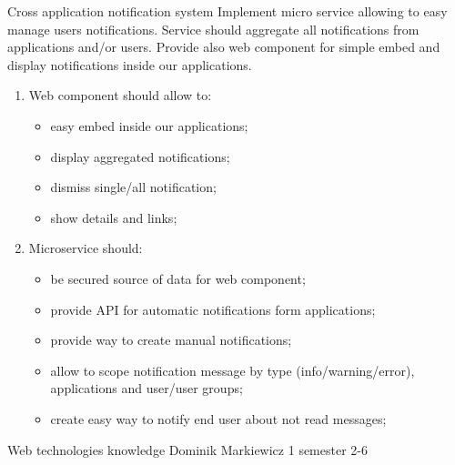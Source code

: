 \begin{project}
{Cross application notification system}
{Implement micro service allowing to easy manage users notifications. Service should aggregate all notifications from applications and/or users. Provide also web component for simple embed and display notifications inside our applications.} 
{
\begin{enumerate}
	\item Web component should allow to:
		\begin{itemize}
			\item easy embed inside our applications;
			\item display aggregated notifications;
			\item dismiss single/all notification;
			\item show details and links;
		\end{itemize}
	\item Microservice should:
		\begin{itemize}
			\item be secured source of data for web component;
			\item provide API for automatic notifications form applications;
			\item provide way to create manual notifications;
			\item allow to scope notification message by type (info/warning/error), applications and user/user groups;
			\item create easy way to notify end user about not read messages;
		\end{itemize}
\end{enumerate}
}
{Web technologies knowledge}
{Dominik Markiewicz}
{1 semester}
{2-6}
\end{project}
